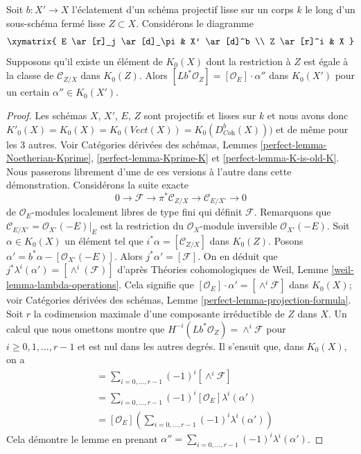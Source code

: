 \begin{lemma}
\label{lemma-good-blowing-up}
Soit $b : X' \to X$ l'éclatement d'un schéma projectif lisse
sur un corps $k$ le long d'un sous-schéma fermé lisse $Z \subset X$.
Considérons le diagramme
$$
\xymatrix{
E \ar[r]_j \ar[d]_\pi & X' \ar[d]^b \\
Z \ar[r]^i & X
}
$$
Supposons qu'il existe un élément de $K_0(X)$ dont la restriction à
$Z$ est égale à la classe de $\mathcal{C}_{Z/X}$ dans $K_0(Z)$.
Alors $[Lb^*\mathcal{O}_Z] = [\mathcal{O}_E] \cdot \alpha''$
dans $K_0(X')$ pour un certain $\alpha'' \in K_0(X')$.
\end{lemma}

\begin{proof}
Les schémas $X$, $X'$, $E$, $Z$ sont projectifs et lisses sur
$k$ et nous avons donc $K'_0(X) = K_0(X) = K_0(\textit{Vect}(X)) =
K_0(D^b_{\textit{Coh}}(X)))$
et de même pour les $3$ autres. Voir Catégories dérivées des schémas, Lemmes
\ref{perfect-lemma-Noetherian-Kprime},
\ref{perfect-lemma-Kprime-K} et \ref{perfect-lemma-K-is-old-K}.
Nous passerons librement d'une de ces versions à l'autre dans cette démonstration.
Considérons la suite exacte
$$
0 \to \mathcal{F} \to \pi^*\mathcal{C}_{Z/X} \to \mathcal{C}_{E/X'} \to 0
$$
de $\mathcal{O}_E$-modules localement libres de type fini qui définit $\mathcal{F}$.
Remarquons que $\mathcal{C}_{E/X'} = \mathcal{O}_{X'}(-E)|_E$
est la restriction du $\mathcal{O}_X$-module inversible
$\mathcal{O}_{X'}(-E)$.
Soit $\alpha \in K_0(X)$ un élément tel que
$i^*\alpha = [\mathcal{C}_{Z/X}]$ dans $K_0(Z)$.
Posons $\alpha' = b^*\alpha - [\mathcal{O}_{X'}(-E)]$.
Alors $j^*\alpha' = [\mathcal{F}]$. On en déduit que
$j^*\lambda^i(\alpha') = [\wedge^i(\mathcal{F})]$ d'après
Théories cohomologiques de Weil, Lemme \ref{weil-lemma-lambda-operations}.
Cela signifie que $[\mathcal{O}_E] \cdot \alpha' = [\wedge^i\mathcal{F}]$
dans $K_0(X)$; voir
Catégories dérivées des schémas, Lemme \ref{perfect-lemma-projection-formula}.
Soit $r$ la codimension maximale d'une composante irréductible de $Z$
dans $X$. Un calcul que nous omettons montre que
$H^{-i}(Lb^*\mathcal{O}_Z) = \wedge^i\mathcal{F}$
pour $i \geq 0, 1, \ldots, r - 1$ et est nul dans les autres degrés.
Il s'ensuit que, dans $K_0(X)$, on a
\begin{align*}
[Lb^*\mathcal{O}_Z] & =
\sum\nolimits_{i = 0, \ldots, r - 1} (-1)^i[\wedge^i\mathcal{F}] \\
& =
\sum\nolimits_{i = 0, \ldots, r - 1} (-1)^i[\mathcal{O}_E] \lambda^i(\alpha') \\
& =
[\mathcal{O}_E] \left(\sum\nolimits_{i = 0, \ldots, r - 1}
(-1)^i \lambda^i(\alpha')\right)
\end{align*}
Cela démontre le lemme en prenant
$\alpha'' = \sum_{i = 0, \ldots, r - 1} (-1)^i \lambda^i(\alpha')$.
\end{proof}



